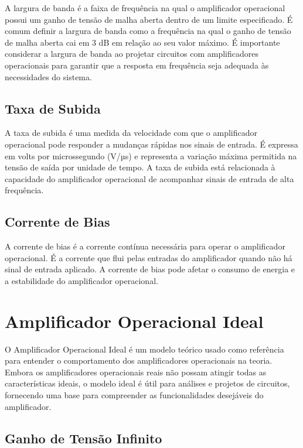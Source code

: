 \documentclass[12pt,twoside, a4paper, twocolumn]{article}
\begin{document}
A largura de banda é a faixa de frequência na qual o amplificador operacional possui um ganho de tensão de malha aberta dentro de um limite especificado. É comum definir a largura de banda como a frequência na qual o ganho de tensão de malha aberta cai em 3 dB em relação ao seu valor máximo. É importante considerar a largura de banda ao projetar circuitos com amplificadores operacionais para garantir que a resposta em frequência seja adequada às necessidades do sistema.

\subsection{Taxa de Subida}

A taxa de subida é uma medida da velocidade com que o amplificador operacional pode responder a mudanças rápidas nos sinais de entrada. É expressa em volts por microssegundo (V/µs) e representa a variação máxima permitida na tensão de saída por unidade de tempo. A taxa de subida está relacionada à capacidade do amplificador operacional de acompanhar sinais de entrada de alta frequência.

\subsection{Corrente de Bias}

A corrente de bias é a corrente contínua necessária para operar o amplificador operacional. É a corrente que flui pelas entradas do amplificador quando não há sinal de entrada aplicado. A corrente de bias pode afetar o consumo de energia e a estabilidade do amplificador operacional.

\section{Amplificador Operacional Ideal}

O Amplificador Operacional Ideal é um modelo teórico usado como referência para entender o comportamento dos amplificadores operacionais na teoria. Embora os amplificadores operacionais reais não possam atingir todas as características ideais, o modelo ideal é útil para análises e projetos de circuitos, fornecendo uma base para compreender as funcionalidades desejáveis do amplificador.

\subsection{Ganho de Tensão Infinito}
\end{document}
